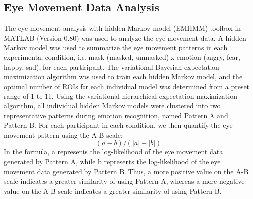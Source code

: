 \subsection{Eye Movement Data Analysis}
The eye movement analysis with hidden Markov model (EMHMM) toolbox in MATLAB (Version 0.80) was used to analyze the eye movement data. A hidden Markov model was used to summarize the eye movement patterns in each experimental condition, i.e. mask (masked, unmasked) x emotion (angry, fear, happy, sad), for each participant. The variational Bayesian expectation-maximization algorithm was used to train each hidden Markov model, and the optimal number of ROIs for each individual model was determined from a preset range of 1 to 11. Using the variational hierarchical expectation-maximization algorithm, all individual hidden Markov models were clustered into two representative patterns during emotion recognition, named Pattern A and Pattern B. For each participant in each condition, we then quantify the eye movement pattern using the A-B scale: 
\begin{equation} \label{eq3}
{(a-b)}/ (| a | + | b |) 
\end{equation}
In the formula, a represents the log-likelihood of the eye movement data generated by Pattern A, while b represents the log-likelihood of the eye movement data generated by Pattern B. Thus, a more positive value on the A-B scale indicates a greater similarity of using Pattern A, whereas a more negative value on the A-B scale indicates a greater similarity of using Pattern B.
